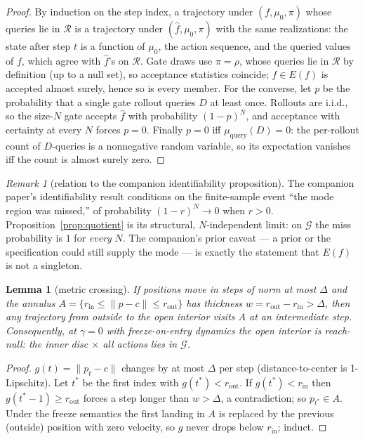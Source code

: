 \documentclass[11pt]{article}
\newtheorem{lemma}{Lemma}
\theoremstyle{remark}
\newtheorem{remark}{Remark}
\begin{document}
\begin{proof}
By induction on the step index, a trajectory under $(f, \mu_0, \pi)$ whose
queries lie in $\mathcal{R}$ is a trajectory under $(\hat f, \mu_0, \pi)$
with the same realizations: the state after step $t$ is a function of
$\mu_0$, the action sequence, and the queried values of $f$, which agree
with $\hat f$'s on $\mathcal{R}$. Gate draws use $\pi = \rho$, whose
queries lie in $\mathcal{R}$ by definition (up to a null set), so acceptance
statistics coincide; $f \in E(f)$ is accepted almost surely, hence so is
every member. For the converse, let $p$ be the probability that a single
gate rollout queries $D$ at least once. Rollouts are i.i.d., so the
size-$N$ gate accepts $\hat f$ with probability $(1 - p)^N$, and
acceptance with certainty at every $N$ forces $p = 0$. Finally $p = 0$
iff $\mu_{\mathrm{query}}(D) = 0$: the per-rollout count of $D$-queries
is a nonnegative random variable, so its expectation vanishes iff the
count is almost surely zero.
\end{proof}

\begin{remark}[relation to the companion identifiability proposition]
The companion paper's identifiability result conditions on the finite-sample
event ``the mode region was missed,'' of probability $(1 - r)^N \to 0$ when
$r > 0$. Proposition~\ref{prop:quotient} is its structural,
$N$-independent limit: on $\mathcal{G}$ the miss probability is $1$ for
\emph{every} $N$. The companion's prior caveat --- a prior or the
specification could still supply the mode --- is exactly the statement that
$E(f)$ is not a singleton.
\end{remark}

\begin{lemma}[metric crossing]
\label{lem:crossing}
If positions move in steps of norm at most $\Delta$ and the annulus
$A = \{ r_{\mathrm{in}} \le \lVert p - c \rVert \le r_{\mathrm{out}} \}$ has
thickness $w = r_{\mathrm{out}} - r_{\mathrm{in}} > \Delta$, then any
trajectory from outside to the open interior visits $A$ at an intermediate
step. Consequently, at $\gamma = 0$ with freeze-on-entry dynamics the open
interior is reach-null: the inner disc $\times$ all actions lies in
$\mathcal{G}$.
\end{lemma}

\begin{proof}
$g(t) = \lVert p_t - c \rVert$ changes by at most $\Delta$ per step
(distance-to-center is 1-Lipschitz). Let $t^*$ be the first index with
$g(t^*) < r_{\mathrm{out}}$. If $g(t^*) < r_{\mathrm{in}}$ then
$g(t^*{-}1) \ge r_{\mathrm{out}}$ forces a step longer than
$w > \Delta$, a contradiction; so $p_{t^*} \in A$. Under the freeze
semantics the first landing in $A$ is replaced by the previous (outside)
position with zero velocity, so $g$ never drops below $r_{\mathrm{in}}$;
induct.
\end{proof}
\end{document}

